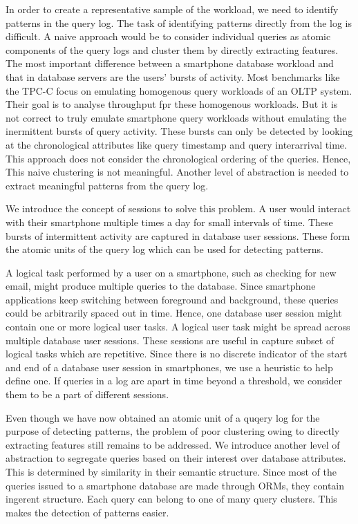 In order to create a representative sample of the workload, we need to identify patterns in the query log. The task of identifying patterns directly from the log is difficult. A naive approach would be to consider individual queries as atomic components of the query logs and cluster them by directly extracting features. The most important difference between a smartphone database workload and that in database servers are the users' bursts of activity. Most benchmarks like the TPC-C focus on emulating homogenous query workloads of an OLTP system. Their goal is to analyse throughput fpr these homogenous workloads. But it is not correct to truly emulate smartphone query workloads without emulating the inermittent bursts of query activity. These bursts can only be detected by looking at the chronological attributes like query timestamp and query interarrival time. This approach does not consider the chronological ordering of the queries. Hence, This naive clustering is not meaningful. Another level of abstraction is needed to extract meaningful patterns from the query log.

We introduce the concept of sessions to solve this problem. A user would interact with their smartphone multiple times a day for small intervals of time. These bursts of intermittent activity are captured in database user sessions. These form the atomic units of the query log which can be used for detecting patterns. 

A logical task performed by a user on a smartphone, such as checking for new email, might produce multiple queries to the database. Since smartphone applications keep switching between foreground and background, these queries could be arbitrarily spaced out in time. Hence, one database user session might contain one or more logical user tasks. A logical user task might be spread across multiple database user sessions. These sessions are useful in capture subset of logical tasks which are repetitive. Since there is no discrete indicator of the start and end of a database user session in smartphones, we use a heuristic to help define one. If queries in a log are apart in time beyond a threshold, we consider them to be a part of different sessions.

Even though we have now obtained an atomic unit of a quqery log for the purpose of detecting patterns, the problem of poor clustering owing to directly extracting features still remains to be addressed. We introduce another level of abstraction to segregate queries based on their interest over database attributes. This is determined by similarity in their semantic structure. Since most of the queries issued to a smartphone database are made through ORMs, they contain ingerent structure. Each query can belong to one of many query clusters. This makes the detection of patterns easier.  

